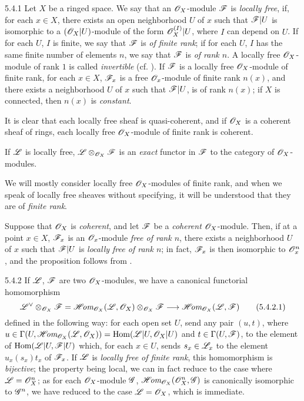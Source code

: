 \begin{env}{5.4.1}
\label{env-0.5.4.1}
Let $X$ be a ringed space. We say that an $\mathscr{O}_X$-module $\mathscr{F}$ is \emph{locally free}, if,
for each $x\in X$, there exists an open neighborhood $U$ of $x$ such that $\mathscr{F}|U$ is
isomorphic to a $(\mathscr{O}_X|U)$-module of the form $\mathscr{O}_X^{(I)}|U$, where $I$ can depend on $U$.
If for each $U$, $I$ is finite, we say that $\mathscr{F}$ is \emph{of finite rank}; if for each
$U$, $I$ has the same finite number of elements $n$, we say that $\mathscr{F}$ is \emph{of rank
$n$}. A locally free $\mathscr{O}_X$-module of rank $1$ is called \emph{invertible}
(cf. ). If $\mathscr{F}$ is a locally free $\mathscr{O}_X$-module of finite rank, for
each $x\in X$, $\mathscr{F}_x$ is a free $\mathscr{O}_x$-module of finite rank $n(x)$, and there exists a
neighborhood $U$ of $x$ such that $\mathscr{F}|U$, is of rank $n(x)$; if $X$ is connected, then
$n(x)$ is \emph{constant}.

It is clear that each locally free sheaf is quasi-coherent, and if $\mathscr{O}_X$ is a coherent
sheaf of rings, each locally free $\mathscr{O}_X$-module of finite rank is coherent.

If $\mathscr{L}$ is locally free, $\mathscr{L}\otimes_{\mathscr{O}_X}\mathscr{F}$ is an \emph{exact} functor in
$\mathscr{F}$ to the category of $\mathscr{O}_X$-modules.

We will mostly consider locally free $\mathscr{O}_X$-modules of finite rank,
and when we speak of locally free sheaves without specifying, it will be understood that
they are of \emph{finite rank}.

Suppose that $\mathscr{O}_X$ is \emph{coherent}, and let $\mathscr{F}$ be a \emph{coherent}
$\mathscr{O}_X$-module. Then, if at a point $x\in X$, $\mathscr{F}_x$ is an $\mathscr{O}_x$-module \emph{free of
rank $n$}, there exists a neighborhood $U$ of $x$ such that $\mathscr{F}|U$ is \emph{locally free
of rank $n$}; in fact, $\mathscr{F}_x$ is then isomorphic to $\mathscr{O}_x^n$, and the proposition
follows from .
\end{env}

\begin{env}{5.4.2}
\label{env-0.5.4.2}
If $\mathscr{L}$, $\mathscr{F}$ are two $\mathscr{O}_X$-modules, we have a canonical functorial homomorphism
\[
  {\mathscr{L}}^\vee\otimes_{\mathscr{O}_X}\mathscr{F}=\mathscr{H}\!\textit{om}_{\mathscr{O}_X}(\mathscr{L},\mathscr{O}_X)\otimes_{\mathscr{O}_X}\mathscr{F}
  \longrightarrow\mathscr{H}\!\textit{om}_{\mathscr{O}_X}(\mathscr{L},\mathscr{F})
  \tag{5.4.2.1}
\]
defined in the following way: for each open set $U$, send any pair $(u,t)$, where
$u\in\Gamma(U,\mathscr{H}\!\textit{om}_{\mathscr{O}_X}(\mathscr{L},\mathscr{O}_X))={\mathop{\mathrm{Hom}}\nolimits}(\mathscr{L}|U,\mathscr{O}_X|U)$ and
$t\in\Gamma(U,\mathscr{F})$, to the element of ${\mathop{\mathrm{Hom}}\nolimits}(\mathscr{L}|U,\mathscr{F}|U)$ which, for each $x\in U$,
sends $s_x\in\mathscr{L}_x$ to the element $u_x(s_x)t_x$ of $\mathscr{F}_x$. If $\mathscr{L}$ is
\emph{locally free of finite rank}, this homomorphism is \emph{bijective}; the property being
local, we can in fact reduce to the case where $\mathscr{L}=\mathscr{O}_X^n$; as for each $\mathscr{O}_X$-module
$\mathscr{G}$, $\mathscr{H}\!\textit{om}_{\mathscr{O}_X}(\mathscr{O}_X^n,\mathscr{G})$ is canonically isomorphic to $\mathscr{G}^n$, we have
reduced to the case $\mathscr{L}=\mathscr{O}_X$, which is immediate.
\end{env}

